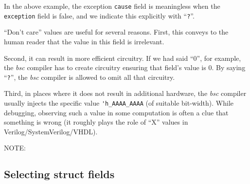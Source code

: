 In the above example, the exception \verb|cause| field is meaningless
when the \verb|exception| field is false, and we indicate this
explicitly with ``\verb|?|''.

``Don't care'' values are useful for several reasons.  First, this
conveys to the human reader that the value in this field is
irrelevant.

Second, it can result in more efficient circuitry.  If we had said
``0'', for example, the \emph{bsc} compiler has to create circuitry
ensuring that field's value is 0. By saying ``\verb|?|'', the
\emph{bsc} compiler is allowed to omit all that circuitry.

Third, in places where it does not result in additional hardware, the
\emph{bsc} compiler usually injects the specific value
\verb|'h_AAAA_AAAA| (of suitable bit-width).  While debugging,
observing such a value in some computation is often a clue that
something is wrong (it roughly plays the role of ``X'' values in
Verilog/SystemVerilog/VHDL).

\vspace{2ex}

NOTE:


\subsection{Selecting struct fields}

